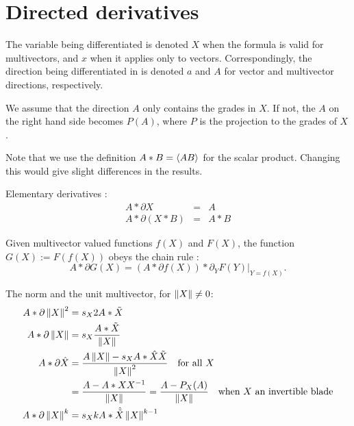 \documentclass[a4paper,12pt]{article}
\begin{document}
\section{Directed derivatives}

The variable being differentiated is denoted $X$ when the formula is valid for multivectors, and $x$ when it applies only to vectors. Correspondingly, the direction being differentiated in is denoted $a$ and $A$ for vector and multivector directions, respectively.

We assume that the direction $A$ only contains the grades in $X$. If not, the $A$ on the right hand side becomes $P(A)$, where $P$ is the projection to the grades of $X$.

Note that we use the definition $A * B = \langle A B\rangle_{}$ for the scalar product. Changing this would give slight differences in the results.

Elementary derivatives \cite{HitzerCalculus}:
\begin{eqnarray}
\label{eq:iddiff}
A * \partial  X &=& A\\
\label{eq:scalpdiff}
A * \partial (X * B)  &=&  A * B
\end{eqnarray}

Given multivector valued functions $f(X)$ and $F(X)$, the function $G(X) := F(f(X))$ obeys the chain rule \cite{HitzerCalculus}:
\begin{equation}
\label{eq:chainrule}
A * \partial G(X) = (A * \partial f(X))*\partial_Y F(Y)\vert_{Y = f(X)}.
\end{equation}

The norm and the unit multivector, for $\left\lVert X\right\rVert \neq 0$:
\begin{align}
\label{eq:normsqrdif}
A * \partial \left\lVert X\right\rVert^2 &= s_{X}2 A * \tilde{X}\\
\label{eq:normdif}
A * \partial \left\lVert X\right\rVert &= s_{X} \frac{A * \tilde{X}}{\left\lVert X\right\rVert}\\
\label{eq:normeddif}
A * \partial \hat{X} &= \frac{A \left\lVert X\right\rVert - s_{X} A * \hat{X} \tilde{X}}{\left\lVert X\right\rVert^2}\quad \textrm {for all $X$}\nonumber\\
&= \frac{A - A * X X^{-1}}{\left\lVert X\right\rVert} = \frac{A- P_{X}(A)}{\left\lVert X\right\rVert}\quad \textrm{when $X$ an invertible blade}\\
\label{eq:normtokdif}
A * \partial \left\lVert X\right\rVert^k &= s_{X} k A * \hat{\tilde{X}} \left\lVert X\right\rVert^{k-1}
\end{align}
\end{document}
